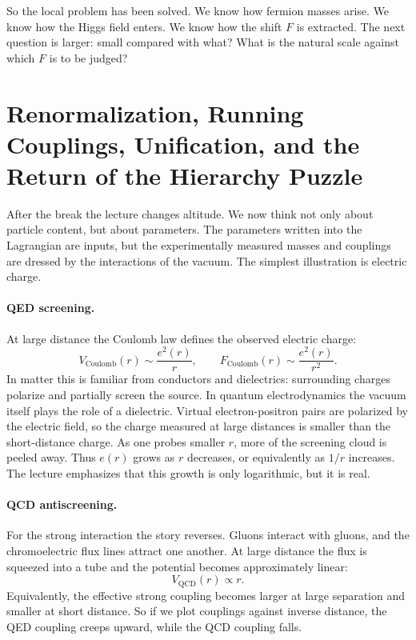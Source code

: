 So the local problem has been solved. We know how fermion masses arise. We know how the Higgs field enters. We know how the shift \(F\) is extracted. The next question is larger: small compared with what? What is the natural scale against which \(F\) is to be judged?

\section{Renormalization, Running Couplings, Unification, and the Return of the Hierarchy Puzzle}

After the break the lecture changes altitude. We now think not only about particle content, but about parameters. The parameters written into the Lagrangian are inputs, but the experimentally measured masses and couplings are dressed by the interactions of the vacuum. The simplest illustration is electric charge.

\paragraph{QED screening.}
At large distance the Coulomb law defines the observed electric charge:
\begin{equation}
V_{\mathrm{Coulomb}}(r)\sim \frac{e^2(r)}{r},
\qquad
F_{\mathrm{Coulomb}}(r)\sim \frac{e^2(r)}{r^2}.
\end{equation}
In matter this is familiar from conductors and dielectrics: surrounding charges polarize and partially screen the source. In quantum electrodynamics the vacuum itself plays the role of a dielectric. Virtual electron-positron pairs are polarized by the electric field, so the charge measured at large distances is smaller than the short-distance charge. As one probes smaller \(r\), more of the screening cloud is peeled away. Thus \(e(r)\) grows as \(r\) decreases, or equivalently as \(1/r\) increases. The lecture emphasizes that this growth is only logarithmic, but it is real.

\paragraph{QCD antiscreening.}
For the strong interaction the story reverses. Gluons interact with gluons, and the chromoelectric flux lines attract one another. At large distance the flux is squeezed into a tube and the potential becomes approximately linear:
\begin{equation}
V_{\mathrm{QCD}}(r)\propto r.
\end{equation}
Equivalently, the effective strong coupling becomes larger at large separation and smaller at short distance. So if we plot couplings against inverse distance, the QED coupling creeps upward, while the QCD coupling falls.

